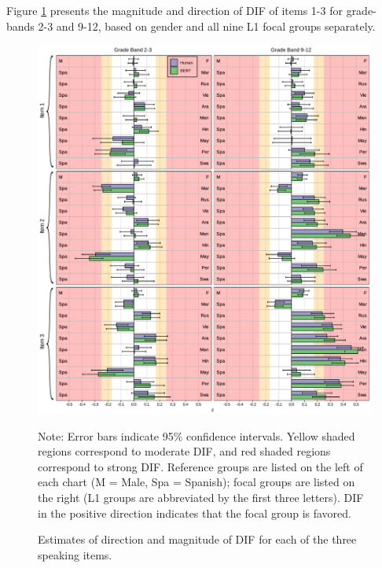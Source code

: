\documentclass [PhD] {uclathes}
\begin{document}
Figure \ref{fig:z_itm} presents the magnitude and direction of DIF of items 1-3 for grade-bands 2-3 and 9-12, based on gender and all nine L1 focal groups separately.

\begin{figure}[t]
    \centering
    \caption{Estimates of direction and magnitude of DIF for each of the three speaking items.}
    \includegraphics[width=16cm]{figures/20230504_ETS-DIF_BERT_z_itm_edit.pdf}
    \label{fig:z_itm}
{\newline Note: Error bars indicate 95\% confidence intervals. Yellow shaded regions correspond to moderate DIF, and red shaded regions correspond to strong DIF. Reference groups are listed on the left of each chart (M = Male, Spa = Spanish); focal groups are listed on the right (L1 groups are abbreviated by the first three letters). DIF in the positive direction indicates that the focal group is favored. \par}
\end{figure}


%
%
%

\end{document}
